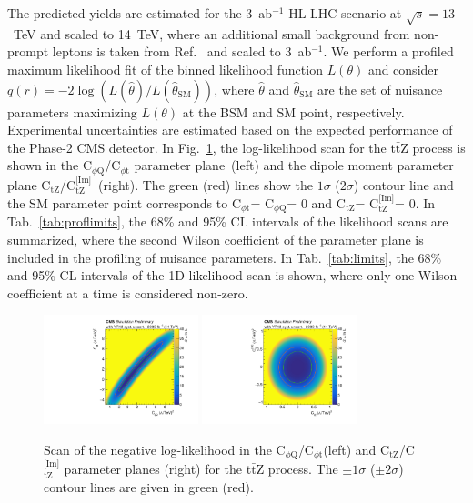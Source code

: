 \documentclass[letterpaper,11pt]{article}
\def\ttZ{t$\bar{\text{t}}$Z\xspace}
\def\ctZ{C$_\text{tZ}$\xspace}
\def\ctZI{C$_\text{tZ}^\text{[Im]}$\xspace}
\def\cpt{C$_{\phi \text{t}}$\xspace}
\def\cpQM{C$_{\phi \text{Q}}$\xspace}
\def\TeV{TeV\xspace}
\begin{document}
The predicted yields are estimated for the 3~ab${}^{-1}$ HL-LHC scenario at $\sqrt{s}=13$~\TeV and scaled to 14~\TeV, where an additional small background from non-prompt leptons is taken from Ref.~\cite{Sirunyan:2017uzs} and scaled to 3~ab${}^{-1}$.
We perform a profiled maximum likelihood fit of the binned likelihood function $L(\theta)$ and consider $q(r)=-2\log(L(\hat{\theta})/L(\hat{\theta}_{\textrm{SM}}))$, where $\hat{\theta}$ and
$\hat{\theta}_\textrm{SM}$ are the set of nuisance parameters maximizing $L(\theta)$ at the BSM and SM point, respectively.
Experimental uncertainties are estimated based on the expected performance of the Phase-2 CMS detector.
In Fig.~\ref{fig:ttZ_nll}, the log-likelihood scan for the \ttZ process is shown in the \cpQM/\cpt parameter plane~(left) and the dipole moment parameter plane \ctZ/\ctZI~(right).
The green (red) lines show the $1\sigma$ ($2\sigma$) contour line and the SM parameter point corresponds to \cpt = \cpQM = 0 and \ctZ = \ctZI = 0.
In Tab.~\ref{tab:proflimits}, the 68\% and 95\% CL intervals of the likelihood scans are summarized, where the second Wilson coefficient of the parameter plane is included in the profiling of nuisance parameters.
In Tab.~\ref{tab:limits}, the 68\% and 95\% CL intervals of the 1D likelihood scan is shown, where only one Wilson coefficient at a time is considered non-zero.

\begin{figure}[tbp]
  \centering
    \includegraphics[trim={0.4cm 0.3cm 0.8cm 0.cm},clip,width=0.4\textwidth]{Figures/cpQM_cpt_lumi3000_14TeV_CMScombine_r1_fullUnc.pdf}
    \hspace{1cm}
    \includegraphics[trim={0.4cm 0.3cm 0.8cm 0.cm},clip,width=0.4\textwidth]{Figures/ctZ_ctZI_lumi3000_14TeV_CMScombine_r1_fullUnc.pdf}
  \caption{Scan of the negative log-likelihood in the \cpQM/\cpt (left) and \ctZ/\ctZI parameter planes (right) for the \ttZ process. 
           The $\pm 1\sigma$ ($\pm 2\sigma$) contour lines are given in green (red).
           }
  \label{fig:ttZ_nll}
\end{figure}
\end{document}
